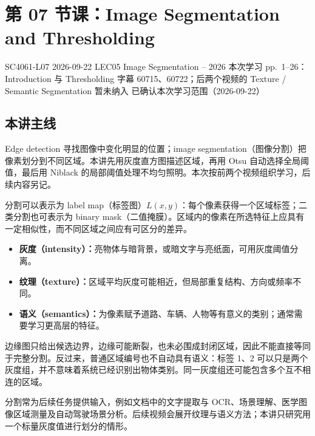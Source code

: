 
\section{第 07 节课：Image Segmentation and Thresholding}
\label{lecture:SC4061-L07}

\lecturemeta
  {SC4061-L07}
  {2026-09-22}
  {LEC05 Image Segmentation -- 2026}
  {本次学习 pp.~1--26：Introduction 与 Thresholding}
  {字幕 60715、60722；后两个视频的 Texture / Semantic Segmentation 暂未纳入}
  {已确认本次学习范围（2026-09-22）}

\subsection{本讲主线}

Edge detection 寻找图像中变化明显的位置；image segmentation（图像分割）把像素划分到不同区域。本讲先用灰度直方图描述区域，再用 Otsu 自动选择全局阈值，最后用 Niblack 的局部阈值处理不均匀照明。本次按前两个视频组织学习，后续内容另记。


分割可以表示为 label map（标签图）$L(x,y)$：每个像素获得一个区域标签；二类分割也可表示为 binary mask（二值掩膜）。区域内的像素在所选特征上应具有一定相似性，而不同区域之间应有可区分的差异。

\begin{itemize}
  \item \textbf{灰度（intensity）：}亮物体与暗背景，或暗文字与亮纸面，可用灰度阈值分离。
  \item \textbf{纹理（texture）：}区域平均灰度可能相近，但局部重复结构、方向或频率不同。
  \item \textbf{语义（semantics）：}为像素赋予道路、车辆、人物等有意义的类别；通常需要学习更高层的特征。
\end{itemize}

边缘图只给出候选边界，边缘可能断裂，也未必围成封闭区域，因此不能直接等同于完整分割。反过来，普通区域编号也不自动具有语义：标签 1、2 可以只是两个灰度组，并不意味着系统已经识别出物体类别。同一灰度组还可能包含多个互不相连的区域。

分割常为后续任务提供输入，例如文档中的文字提取与 OCR、场景理解、医学图像区域测量及自动驾驶场景分析。后续视频会展开纹理与语义方法；本讲只研究用一个标量灰度值进行划分的情形。

